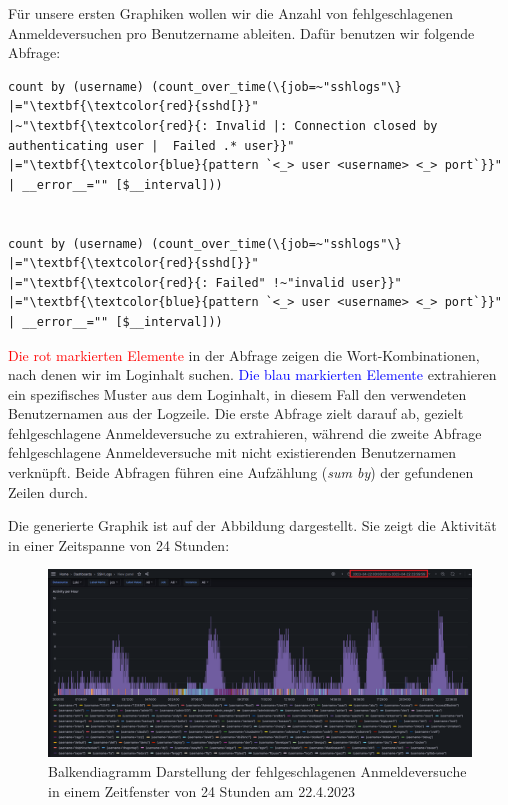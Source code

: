 Für unsere ersten Graphiken wollen wir die Anzahl von fehlgeschlagenen Anmeldeversuchen pro Benutzername ableiten. Dafür benutzen wir folgende Abfrage:

{
\begin{Verbatim}[fontsize=\small,commandchars=\\\{\},frame=single]
count by (username) (count_over_time(\{job=~"sshlogs"\} 
|="\textbf{\textcolor{red}{sshd[}}"
|~"\textbf{\textcolor{red}{: Invalid |: Connection closed by authenticating user |  Failed .* user}}"
|="\textbf{\textcolor{blue}{pattern `<_> user <username> <_> port`}}"
| __error__="" [$__interval]))


count by (username) (count_over_time(\{job=~"sshlogs"\}
|="\textbf{\textcolor{red}{sshd[}}"
|="\textbf{\textcolor{red}{: Failed" !~"invalid user}}"
|="\textbf{\textcolor{blue}{pattern `<_> user <username> <_> port`}}"
| __error__="" [$__interval]))
\end{Verbatim}
}

\textcolor{red}{Die rot markierten Elemente} in der Abfrage zeigen die Wort-Kombinationen, nach denen wir im Loginhalt suchen. \textcolor{blue}{Die blau markierten Elemente} extrahieren ein spezifisches Muster aus dem Loginhalt, in diesem Fall den verwendeten Benutzernamen aus der Logzeile. Die erste Abfrage zielt darauf ab, gezielt fehlgeschlagene Anmeldeversuche zu extrahieren, während die zweite Abfrage fehlgeschlagene Anmeldeversuche mit nicht existierenden Benutzernamen verknüpft. Beide Abfragen führen eine Aufzählung (\textit{sum by}) der gefundenen Zeilen durch.

Die generierte Graphik ist auf der Abbildung \label{fig:2_Anmeldung_BenutzerName} dargestellt. Sie zeigt die Aktivität in einer Zeitspanne von 24 Stunden:

\newpage
{}
\thispagestyle{lscape}
\begin{landscape}
    \begin{figure}[H]
        \centerline{\includegraphics[width=1.5\textwidth]{assets/activityperhour.png}}
        \caption[Balkendiagramm Darstellung der fehlgeschlagenen Anmeldeversuche in einem Zeitfenster von 24 Stunden am ]
        {Balkendiagramm Darstellung der fehlgeschlagenen Anmeldeversuche in einem Zeitfenster von 24 Stunden am 22.4.2023}
        \label{fig:2_Anmeldung_BenutzerName}
        \centering
    \end{figure}
\end{landscape}
\restoregeometry

